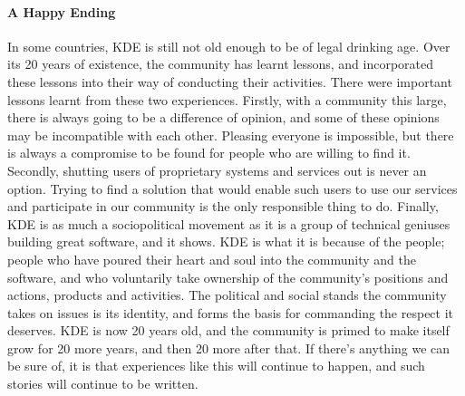 \paragraph{A Happy Ending}
In some countries, KDE is still not old enough to be of legal drinking age. Over its 20 years of existence, the community has learnt lessons, and incorporated these lessons into their way of conducting their activities. There were important lessons learnt from these two experiences.
Firstly, with a community this large, there is always going to be a difference of opinion, and some of these opinions may be incompatible with each other. Pleasing everyone is impossible, but there is always a compromise to be found for people who are willing to find it.
Secondly, shutting users of proprietary systems and services out is never an option. Trying to find a solution that would enable such users to use our services and participate in our community is the only responsible thing to do.
Finally, KDE is as much a sociopolitical movement as it is a group of technical geniuses building great software, and it shows. KDE is what it is because of the people; people who have poured their heart and soul into the community and the software, and who voluntarily take ownership of the community’s positions and actions, products and activities. The political and social stands the community takes on issues is its identity, and forms the basis for commanding the respect it deserves.
KDE is now 20 years old, and the community is primed to make itself grow for 20 more years, and then 20 more after that. If there’s anything we can be sure of, it is that experiences like this will continue to happen, and such stories will continue to be written.